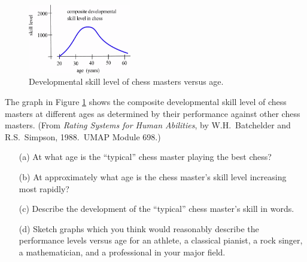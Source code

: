 \begin{enumerate}
\begin{minipage}{\linewidth}
\begin{figure}
    \centering
    \includegraphics[width=0.4\textwidth]{img/chap2/image010.png}
    \caption{Developmental skill level of chess masters versus age.}
    \label{fig:2-2-exer8}
\end{figure}

\item	The graph in Figure \ref{fig:2-2-exer8} shows the composite developmental skill level of chess masters at different ages as determined by their performance against other chess masters.  (From {\em Rating Systems for Human Abilities}, by W.H.\ Batchelder and R.S.\ Simpson, 1988.\ UMAP Module 698.)
\begin{itemize}
    \item[(a)]	At what age is the ``typical'' chess master playing the best chess?
    \item[(b)]	At approximately what age is the chess master's skill level increasing most rapidly?
    \item[(c)]	Describe the development of the ``typical'' chess master's skill in words.
    \item[(d)]	Sketch graphs which you think would reasonably describe the performance levels versus age for an athlete, a classical pianist, a rock singer, a mathematician, and a professional in your major field.
\end{itemize}
\end{minipage}
\end{enumerate}
